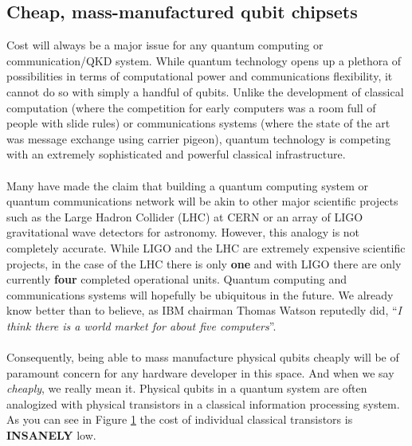 \documentclass[aps,prl,twocolumn,10pt,nofootinbib]{revtex4}
\begin{document}
\subsection{Cheap, mass-manufactured qubit chipsets}
Cost will always be a major issue for any quantum computing or communication/QKD system.  While quantum technology opens up a plethora of possibilities in terms of computational power and communications flexibility, it cannot do so with simply a handful of qubits.  Unlike the development of classical computation (where the competition for early computers was a room full of people with slide rules) or communications systems (where the state of the art was message exchange using carrier pigeon), quantum technology is competing with an extremely sophisticated and powerful classical infrastructure.  
\\
\\
Many have made the claim that building a quantum computing system or quantum communications network will be akin to other major scientific projects such as the Large Hadron Collider (LHC) at CERN or an array of LIGO gravitational wave detectors for astronomy.  However, this analogy is not completely accurate.  While LIGO and the LHC are extremely expensive scientific projects, in the case of the LHC there is only {\bf one} and with LIGO there are only currently {\bf four} completed operational units.  Quantum computing and communications systems will hopefully be ubiquitous in the future.  We already know better than to believe, as IBM chairman Thomas Watson reputedly did, ``{\em I think there is a world market for about five computers}''.  
\\
\\
Consequently, being able to mass manufacture physical qubits cheaply will be of paramount concern for any hardware developer in this space.  And when we say {\em cheaply}, we really mean it.  Physical qubits in a quantum system are often analogized with physical transistors in a classical information processing system.  As you can see in Figure \ref{fig:price} the cost of individual classical transistors is {\bf INSANELY} low.  
\begin{figure}[ht!]
	\caption{}
	\label{fig:price}
\end{figure}
\end{document}
